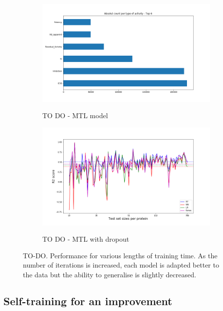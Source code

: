 \documentclass[10pt]{article}
\begin{document}
\begin{figure}[h]
	\begin{subfigure}{.53\textwidth}
		\centering
		\caption{TO DO - MTL model}
		\includegraphics[width=\textwidth]{figs/activities-all.png}
		\label{fig:MTL}
	\end{subfigure}
	\begin{subfigure}{.53\textwidth}
		\caption{TO DO - MTL with dropout} 
		\centering
		\includegraphics[width=\textwidth]{figs/Valid-all.png}
		\label{fig:MTLD}
	\end{subfigure}
	\caption{{\small  TO-DO. Performance for various lengths of training time. As the number of iterations is increased, each model is adapted better to the data but the ability to generalise is slightly decreased.} }
\end{figure}

\subsection{Self-training for an improvement}
\end{document}
